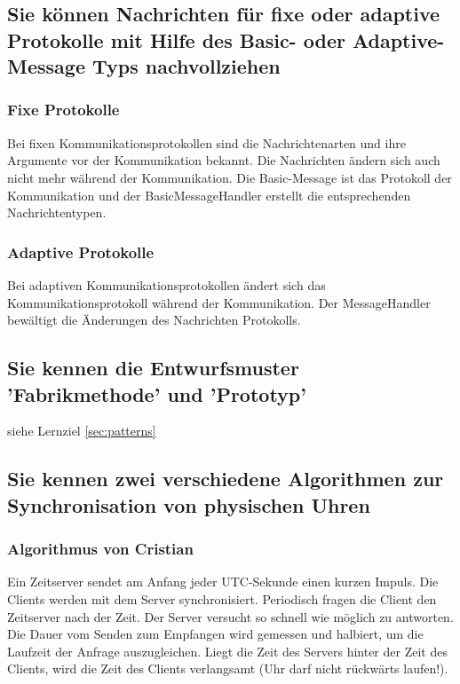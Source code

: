 \subsection{Sie können Nachrichten für fixe oder adaptive Protokolle mit Hilfe des Basic- oder Adaptive-Message Typs nachvollziehen}

\subsubsection{Fixe Protokolle}

Bei fixen Kommunikationsprotokollen sind die Nachrichtenarten und ihre Argumente vor der Kommunikation bekannt. Die Nachrichten ändern sich auch nicht mehr während der Kommunikation. Die Basic-Message ist das Protokoll der Kommunikation und der BasicMessageHandler erstellt die entsprechenden Nachrichtentypen.

\subsubsection{Adaptive Protokolle}

Bei adaptiven Kommunikationsprotokollen ändert sich das Kommunikationsprotokoll während der Kommunikation. Der MessageHandler bewältigt die Änderungen des Nachrichten Protokolls.

\subsection{Sie kennen die Entwurfsmuster 'Fabrikmethode' und 'Prototyp'}

siehe Lernziel \ref{sec:patterns}

\subsection{Sie kennen zwei verschiedene Algorithmen zur Synchronisation von physischen Uhren}

\subsubsection{Algorithmus von Cristian}

Ein Zeitserver sendet am Anfang jeder UTC-Sekunde einen kurzen Impuls. Die Clients werden mit dem Server synchronisiert. Periodisch fragen die Client den Zeitserver nach der Zeit. Der Server versucht so schnell wie möglich zu antworten. Die Dauer vom Senden zum Empfangen wird gemessen und halbiert, um die Laufzeit der Anfrage auszugleichen. Liegt die Zeit des Servers hinter der Zeit des Clients, wird die Zeit des Clients verlangsamt (Uhr darf nicht rückwärts laufen!).


